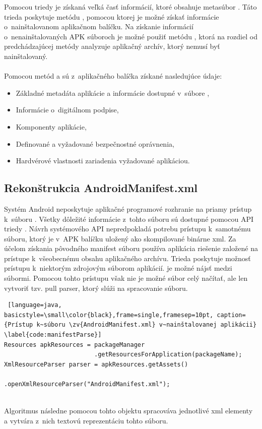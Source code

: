 Pomocou triedy  je získaná veľká časť informácií, ktoré obsahuje metasúbor . Táto trieda poskytuje metódu , pomocou ktorej je možné získať informácie o~nainštalovanom aplikačnom balíčku. Na získanie informácií o~nenainštalovaných APK súboroch je možné použiť metódu , ktorá na rozdiel od predchádzajúcej metódy analyzuje aplikačný archív, ktorý nemusí byť nainštalovaný.
\\\\
\noindent Pomocou metód  a  sú z~aplikačného balíčka získané nasledujúce údaje:
\begin{itemize}
	\item Základné metadáta aplikácie a informácie dostupné v~súbore ,
	\item Informácie o~digitálnom podpise,
	\item Komponenty aplikácie,
	\item Definované a vyžadované bezpečnostné oprávnenia,
	\item Hardvérové vlastnosti zariadenia vyžadované aplikáciou.
\end{itemize}

\subsection{Rekonštrukcia AndroidManifest.xml}
Systém Android neposkytuje aplikačné programové rozhranie na priamy prístup k~súboru . Všetky dôležité informácie z~tohto súboru sú dostupné pomocou API triedy . Návrh systémového API nepredpokladá potrebu prístupu k~samotnému  súboru, ktorý je v~APK balíčku uložený ako skompilované binárne xml.  Za účelom získania pôvodného manifest súboru používa aplikácia  riešenie založené na prístupe k~všeobecnému obsahu aplikačného archívu. Trieda  poskytuje možnosť prístupu k~niektorým zdrojovým súborom aplikácií.  je možné nájsť medzi 
 súbormi. Pomocou tohto prístupu však nie je možné súbor celý načítať, ale len vytvoriť tzv. pull parser, ktorý slúži na spracovanie  súboru. 
\begin{lstlisting} [language=java, basicstyle=\small\color{black},frame=single,framesep=10pt, caption= {Prístup k~súboru \zv{AndroidManifest.xml} v~nainštalovanej aplikácii} \label{code:manifestParse}]
Resources apkResources = packageManager
                         .getResourcesForApplication(packageName);
XmlResourceParser parser = apkResources.getAssets()
                         .openXmlResourceParser("AndroidManifest.xml");
\end{lstlisting}
\mbox{}\\
\noindent Algoritmus následne pomocou tohto objektu spracováva jednotlivé xml elementy a vytvára z~nich textovú reprezentáciu tohto súboru.

